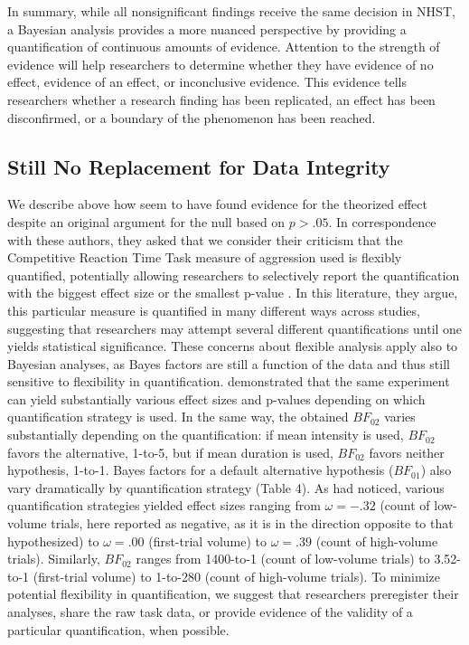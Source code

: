 \documentclass[fignum,nobf,man]{apa}
\begin{document}
In summary, while all nonsignificant findings receive the same decision in NHST, a Bayesian analysis provides a more nuanced perspective by providing a quantification of continuous amounts of evidence. Attention to the strength of evidence will help researchers to determine whether they have evidence of no effect, evidence of an effect, or inconclusive evidence. This evidence tells researchers whether a research finding has been replicated, an effect has been disconfirmed, or a boundary of the phenomenon has been reached.

\subsection{Still No Replacement for Data Integrity} %
We describe above how \citet{Elson:etal:2013} seem to have found evidence for the theorized effect despite an original argument for the null based on $p > .05$. In correspondence with these authors, they asked that we consider their criticism that the Competitive Reaction Time Task measure of aggression %
used is flexibly quantified, potentially allowing researchers to selectively report the quantification with the biggest effect size or the smallest p-value \citep{Elson:etal:2014}. In this literature, they argue, this particular measure is quantified in many different ways across studies, suggesting that researchers may attempt several different quantifications until one yields statistical significance. These concerns about flexible analysis apply also to Bayesian analyses, as Bayes factors are still a function of the data and thus still sensitive to flexibility in quantification. \citet{Elson:etal:2014} demonstrated that the same experiment can yield substantially various effect sizes and p-values depending on which quantification strategy is used. In the same way, the obtained $BF_{02}$ varies substantially depending on the quantification: if mean intensity is used, $BF_{02}$ favors the alternative, 1-to-5, but if mean duration is used, $BF_{02}$ favors neither hypothesis, 1-to-1. Bayes factors for a default alternative hypothesis ($BF_{01}$) also vary dramatically by quantification strategy (Table 4). As \citet{Elson:etal:2014} had noticed, various quantification strategies yielded effect sizes ranging from $\omega = -.32$ (count of low-volume trials, here reported as negative, as it is in the direction opposite to that hypothesized) to $\omega = .00$ (first-trial volume) to $\omega = .39$ (count of high-volume trials). Similarly, $BF_{02}$ ranges from 1400-to-1 (count of low-volume trials) to 3.52-to-1 (first-trial volume) to 1-to-280 (count of high-volume trials). To minimize potential flexibility in quantification, we suggest that researchers preregister their analyses, share the raw task data, or provide evidence of the validity of a particular quantification, when possible. %
\end{document}
